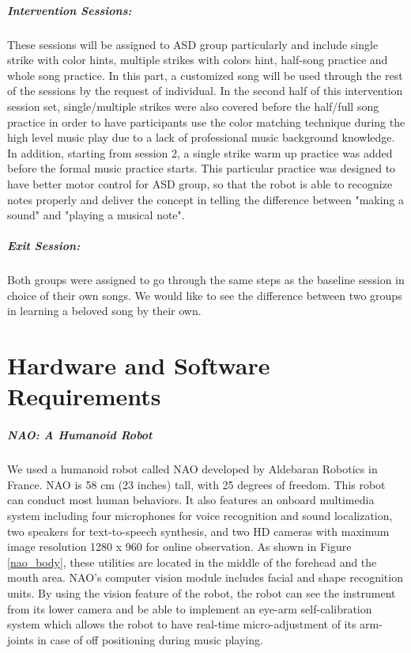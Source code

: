 \documentclass[12pt, a4paper]{article}
\begin{document}
\subparagraph{Intervention Sessions: }These sessions will be assigned to ASD group
particularly and include single strike with color hints, multiple strikes with
colors hint, half-song practice and whole song practice. In this part, a customized 
song will be used through the rest of the sessions by the request of individual. In the second
half of this intervention session set, single/multiple strikes were also covered
before the half/full song practice in order to have participants use the
color matching technique during the high level music play due to a lack of professional
music background knowledge. In addition, starting from session 2, a single strike
warm up practice was added before the formal music practice starts. This particular
practice was designed to have better motor control for ASD group, so that
the robot is able to recognize notes properly and deliver the concept in telling the
difference between "making a sound" and "playing a musical note". \\

\subparagraph{Exit Session: }Both groups were assigned to go through the same steps
as the baseline session in choice of their own songs. We would like to see the 
difference between two groups in learning a beloved song by their own.\\

\section*{Hardware and Software Requirements}
\subparagraph{NAO: A Humanoid Robot}We used a humanoid  robot called NAO developed by Aldebaran Robotics in France. 
NAO is 58 cm (23 inches) tall, with 25 degrees of freedom. This robot 
can conduct most human behaviors. It also features an onboard multimedia 
system including four microphones for voice recognition and sound localization, 
two speakers for text-to-speech synthesis, and two HD cameras with maximum image 
resolution 1280 x 960 for online observation. As shown in Figure \ref{nao_body}, these 
utilities are located in the middle of the forehead and the mouth area. NAO’s 
computer vision module includes facial and shape recognition units. By using the 
vision feature of the robot, the robot can see the instrument 
from its lower camera and be able to implement an eye-arm self-calibration 
system which allows the robot to have real-time micro-adjustment of its 
arm-joints in case of off positioning during music playing.\\
\end{document}
